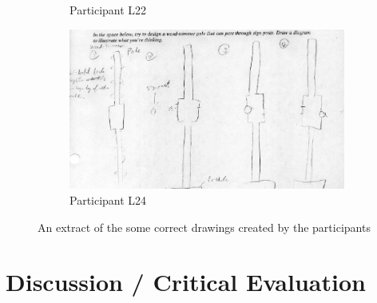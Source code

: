\documentclass[12pt]{article}
\begin{document}
\begin{figure}[h!]
\begin{subfigure}[b]{0.45\linewidth}
    \caption{Participant L22}
  \end{subfigure}
  \begin{subfigure}[b]{0.45\linewidth}
    \includegraphics[width=\linewidth]{images/drawing_l24_con2.PNG}
    \caption{Participant L24}
  \end{subfigure}
  \caption{An extract of the some correct drawings created by the participants}
  \label{fig:coffee3}
\end{figure}


\section{Discussion / Critical Evaluation}

\noindent




\end{document}
